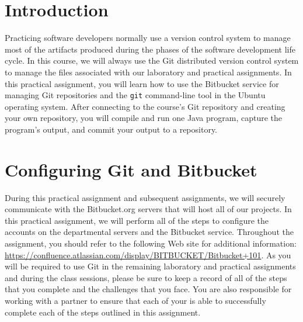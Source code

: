 


\usepackage[compact]{titlesec}



% 

\section*{Introduction}

Practicing software developers normally use a version control system to manage most of the artifacts produced during the
phases of the software development life cycle.  In this course, we will always use the Git distributed version control
system to manage the files associated with our laboratory and practical assignments.  In this practical assignment, you
will learn how to use the Bitbucket service for managing Git repositories and the {\tt git} command-line tool in the
Ubuntu operating system. After connecting to the course's Git repository and creating your own repository, you will
compile and run one Java program, capture the program's output, and commit your output to a repository.

\section*{Configuring Git and Bitbucket}

During this practical assignment and subsequent assignments, we will securely communicate with the Bitbucket.org
servers that will host all of our projects.  In this practical assignment, we will perform all of the steps to configure
the accounts on the departmental servers and the Bitbucket service.  Throughout the assignment, you should refer to the
following Web site for additional information: \url{https://confluence.atlassian.com/display/BITBUCKET/Bitbucket+101}.
As you will be required to use Git in the remaining laboratory and practical assignments and during the class sessions,
please be sure to keep a record of all of the steps that you complete and the challenges that you face.  You are also
responsible for working with a partner to ensure that each of your is able to successfully complete each of the steps
outlined in this assignment.

